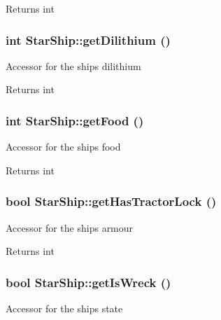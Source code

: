 \begin{DoxyReturn}{Returns}
int 
\end{DoxyReturn}
\hypertarget{classStarShip_a3c371aaeccfab3f6e406a14d25daca18}{
\subsubsection[{getDilithium}]{\setlength{\rightskip}{0pt plus 5cm}int StarShip::getDilithium ()}}
\label{da/d97/classStarShip_a3c371aaeccfab3f6e406a14d25daca18}
Accessor for the ships dilithium

\begin{DoxyReturn}{Returns}
int 
\end{DoxyReturn}
\hypertarget{classStarShip_af770b4878c7b724d96c0ed4e7d13c0fa}{
\subsubsection[{getFood}]{\setlength{\rightskip}{0pt plus 5cm}int StarShip::getFood ()}}
\label{da/d97/classStarShip_af770b4878c7b724d96c0ed4e7d13c0fa}
Accessor for the ships food

\begin{DoxyReturn}{Returns}
int 
\end{DoxyReturn}
\hypertarget{classStarShip_af072da551eff3b24cce85dd5f33efba3}{
\subsubsection[{getHasTractorLock}]{\setlength{\rightskip}{0pt plus 5cm}bool StarShip::getHasTractorLock ()}}
\label{da/d97/classStarShip_af072da551eff3b24cce85dd5f33efba3}
Accessor for the ships armour

\begin{DoxyReturn}{Returns}
int 
\end{DoxyReturn}
\hypertarget{classStarShip_ac0a6b7de51c9b461ca186d1412f4208f}{
\subsubsection[{getIsWreck}]{\setlength{\rightskip}{0pt plus 5cm}bool StarShip::getIsWreck ()}}
\label{da/d97/classStarShip_ac0a6b7de51c9b461ca186d1412f4208f}
Accessor for the ships state

